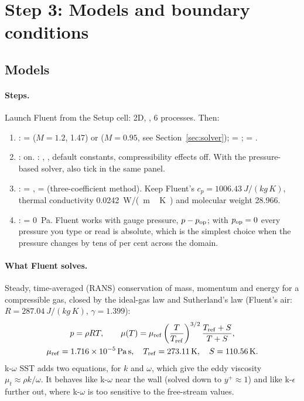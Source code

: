\section{Step 3: Models and boundary conditions}
\label{sec:physics}

\subsection{Models}

\paragraph{Steps.} Launch Fluent from the Setup cell:  2D, ,
6 processes. Then:
\begin{enumerate}
\item {}:  =  ($M = 1.2$, 1.47) or 
($M = 0.95$, see Section~\ref{sec:solver});  = ;  =
.
\item {}\then{}: on. \then{}: , ,
default constants, compressibility effects off. With the pressure-based solver, also tick  in the same panel.
\item {}\then{}:  = ,  =
 (three-coefficient method). Keep Fluent's $c_p = \SI{1006.43}{J/(kg\,K)}$, thermal
conductivity \SI{0.0242}{W/(m\,K)} and molecular weight 28.966.
\item {}:  = \SI{0}{Pa}. Fluent works with gauge
pressure, $p - p_{\rm op}$; with $p_{\rm op} = 0$ every pressure you type or read is absolute, which is the
simplest choice when the pressure changes by tens of per cent across the domain.
\end{enumerate}

\paragraph{What Fluent solves.} Steady, time-averaged (RANS) conservation of mass, momentum and energy
for a compressible gas, closed by the ideal-gas law and Sutherland's law (Fluent's air:
$R = \SI{287.04}{J/(kg\,K)}$, $\gamma = 1.399$):
\begin{gather}
p = \rho R T, \qquad
\mu(T) = \mu_{\rm ref}\left(\frac{T}{T_{\rm ref}}\right)^{3/2}\frac{T_{\rm ref} + S}{T + S}, \\
\mu_{\rm ref} = \SI{1.716e-5}{Pa\,s},\quad T_{\rm ref} = \SI{273.11}{K},\quad S = \SI{110.56}{K}. \notag
\end{gather}
k-$\omega$ SST adds two equations, for $k$ and $\omega$, which give the eddy viscosity
$\mu_t \approx \rho k/\omega$. It behaves like k-$\omega$ near the wall (solved down to $y^+ \approx 1$)
and like k-$\epsilon$ further out, where k-$\omega$ is too sensitive to the free-stream values.

